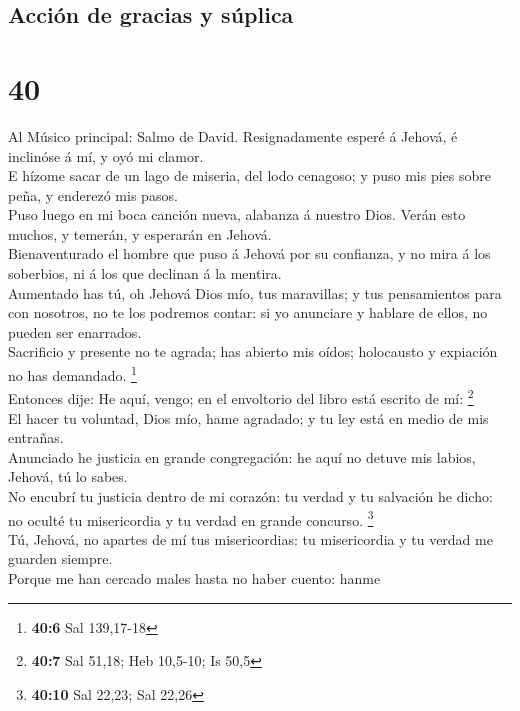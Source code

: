 \hypertarget{acciuxf3n-de-gracias-y-suxfaplica}{%
\subsection{Acción de gracias y
súplica}\label{acciuxf3n-de-gracias-y-suxfaplica}}

\hypertarget{section-39}{%
\section{40}\label{section-39}}

 Al Músico principal: Salmo de David. Resignadamente
esperé á Jehová, é inclinóse á mí, y oyó mi clamor.\\
 E hízome sacar de un lago de miseria, del lodo cenagoso;
y puso mis pies sobre peña, y enderezó mis pasos.\\
 Puso luego en mi boca canción nueva, alabanza á nuestro
Dios. Verán esto muchos, y temerán, y esperarán en Jehová.\\
 Bienaventurado el hombre que puso á Jehová por su
confianza, y no mira á los soberbios, ni á los que declinan á la
mentira.\\
 Aumentado has tú, oh Jehová Dios mío, tus maravillas; y
tus pensamientos para con nosotros, no te los podremos contar: si yo
anunciare y hablare de ellos, no pueden ser enarrados.\\
 Sacrificio y presente no te agrada; has abierto mis
oídos; holocausto y expiación no has demandado. \footnote{\textbf{40:6}
  Sal 139,17-18}\\
 Entonces dije: He aquí, vengo; en el envoltorio del libro
está escrito de mí: \footnote{\textbf{40:7} Sal 51,18; Heb 10,5-10; Is
  50,5}\\
 El hacer tu voluntad, Dios mío, hame agradado; y tu ley
está en medio de mis entrañas.\\
 Anunciado he justicia en grande congregación: he aquí no
detuve mis labios, Jehová, tú lo sabes.\\
 No encubrí tu justicia dentro de mi corazón: tu verdad y
tu salvación he dicho: no oculté tu misericordia y tu verdad en grande
concurso. \footnote{\textbf{40:10} Sal 22,23; Sal 22,26}\\
 Tú, Jehová, no apartes de mí tus misericordias: tu
misericordia y tu verdad me guarden siempre.\\
 Porque me han cercado males hasta no haber cuento: hanme
